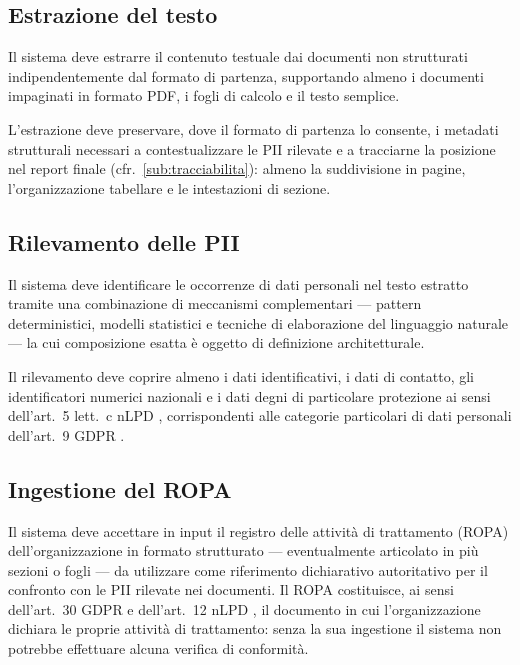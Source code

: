 \subsection{Estrazione del testo}
\label{sub:estrazione-testo}
Il sistema deve estrarre il contenuto testuale dai documenti non strutturati indipendentemente dal formato di partenza, supportando almeno i documenti impaginati in formato PDF, i fogli di calcolo e il testo semplice. \medskip

L'estrazione deve preservare, dove il formato di partenza lo consente, i metadati strutturali necessari a contestualizzare le PII rilevate e a tracciarne la posizione nel report finale (cfr.~\ref{sub:tracciabilita}): almeno la suddivisione in pagine, l'organizzazione tabellare e le intestazioni di sezione.

\subsection{Rilevamento delle PII}
\label{sub:rilevamento-pii}
Il sistema deve identificare le occorrenze di dati personali nel testo estratto tramite una combinazione di meccanismi complementari --- pattern deterministici, modelli statistici e tecniche di elaborazione del linguaggio naturale \cite{makhambetComparativeAnalysisMachine2025, rajgarhiaEvaluationStudyHybrid2025, velishettyPersonalIdentifiableInformation2024} --- la cui composizione esatta è oggetto di definizione architetturale. \medskip

Il rilevamento deve coprire almeno i dati identificativi, i dati di contatto, gli identificatori numerici nazionali e i dati degni di particolare protezione ai sensi dell'art.~5 lett.~c nLPD \cite{RS2351Legge}, corrispondenti alle categorie particolari di dati personali dell'art.~9 GDPR \cite{RegolamentoUE20162016}.

\subsection{Ingestione del ROPA}
\label{sub:ingestione-ropa}
Il sistema deve accettare in input il registro delle attività di trattamento (ROPA) dell'organizzazione in formato strutturato --- eventualmente articolato in più sezioni o fogli --- da utilizzare come riferimento dichiarativo autoritativo per il confronto con le PII rilevate nei documenti. Il ROPA costituisce, ai sensi dell'art.~30 GDPR \cite{RegolamentoUE20162016} e dell'art.~12 nLPD \cite{RS2351Legge}, il documento in cui l'organizzazione dichiara le proprie attività di trattamento: senza la sua ingestione il sistema non potrebbe effettuare alcuna verifica di conformità. \medskip

